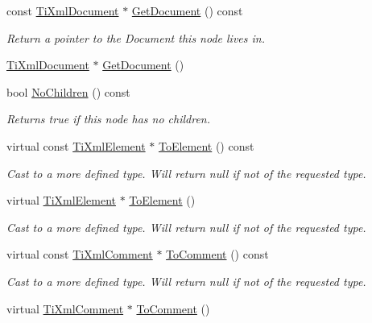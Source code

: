 \begin{DoxyCompactItemize}
const \hyperlink{classTiXmlDocument}{TiXmlDocument} $\ast$ \hyperlink{classTiXmlNode_aa66f4ebcd175204a168ed7c2d7b43071}{GetDocument} () const 
\begin{DoxyCompactList}\small\item\em Return a pointer to the Document this node lives in. \item\end{DoxyCompactList}\item 
\hyperlink{classTiXmlDocument}{TiXmlDocument} $\ast$ \hyperlink{classTiXmlNode_a7b2372c0e7adfb32f5b6902fe49a39b2}{GetDocument} ()
\item 
bool \hyperlink{classTiXmlNode_aeed21ad30630ef6e7faf096127edc9f3}{NoChildren} () const 
\begin{DoxyCompactList}\small\item\em Returns true if this node has no children. \item\end{DoxyCompactList}\item 
virtual const \hyperlink{classTiXmlElement}{TiXmlElement} $\ast$ \hyperlink{classTiXmlNode_a72abed96dc9667ab9e0a2a275301bb1c}{ToElement} () const 
\begin{DoxyCompactList}\small\item\em Cast to a more defined type. Will return null if not of the requested type. \item\end{DoxyCompactList}\item 
virtual \hyperlink{classTiXmlElement}{TiXmlElement} $\ast$ \hyperlink{classTiXmlNode_aa65d000223187d22a4dcebd7479e9ebc}{ToElement} ()
\begin{DoxyCompactList}\small\item\em Cast to a more defined type. Will return null if not of the requested type. \item\end{DoxyCompactList}\item 
virtual const \hyperlink{classTiXmlComment}{TiXmlComment} $\ast$ \hyperlink{classTiXmlNode_aa0a5086f9eaee910bbfdc7f975e26574}{ToComment} () const 
\begin{DoxyCompactList}\small\item\em Cast to a more defined type. Will return null if not of the requested type. \item\end{DoxyCompactList}\item 
virtual \hyperlink{classTiXmlComment}{TiXmlComment} $\ast$ \hyperlink{classTiXmlNode_a383e06a0787f7063953934867990f849}{ToComment} ()

\end{DoxyCompactItemize}
